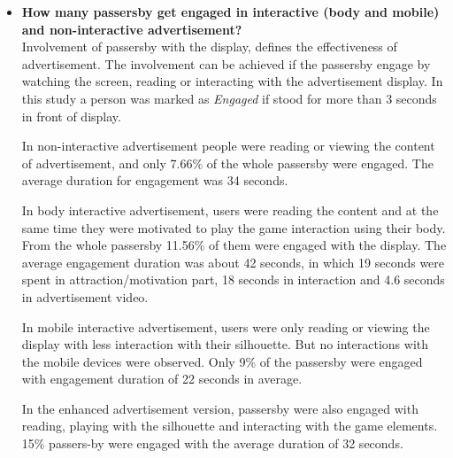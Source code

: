 \begin{itemize}
\iffalse
Honeypot effect, which increases the attention level of passers-by toward display, was also statistically increased with the use of body interactive advertisement compared to non-interactive advertisement, and the mobile interactive was insignificant to non-interactive. In enhanced advertisement version the honeypot effects were not increase compared to body interactive maybe because of limited number of days.

Landing effects that drags the passers-by suddenly toward display, in non-interactive advertisement this effect were less than interactive advertisement both body and mobile interactive. The landing effect in enhanced version was not significant because of its extended angle of tracking.
\fi



\item \textbf{How many passersby get engaged in interactive (body and mobile) and non-interactive advertisement?} \\
Involvement of passersby with the display, defines the effectiveness of advertisement. The involvement can be achieved if the passersby engage by watching the screen, reading or interacting with the advertisement display. In this study a person was marked as \emph{Engaged} if stood for more than 3 seconds in front of display.

In non-interactive advertisement people were reading or viewing the content of advertisement, and only 7.66\% of the whole passersby were engaged. The average duration for engagement was 34 seconds.

In body interactive advertisement, users were reading the content and at the same time they were motivated to play the game interaction using their body. From the whole passersby 11.56\% of them were engaged with the display. The average engagement duration was about 42 seconds, in which 19 seconds were spent in attraction/motivation part, 18 seconds in interaction and 4.6 seconds in advertisement video.

In mobile interactive advertisement, users were only reading or viewing the display with less interaction with their silhouette. But no interactions with the mobile devices were observed. Only 9\% of the passersby were engaged with engagement duration of 22 seconds in average.

In the enhanced advertisement version, passersby were also engaged with reading, playing with the silhouette and interacting with the game elements. 15\% passers-by were engaged with the average duration of 32 seconds. 


\end{itemize}
